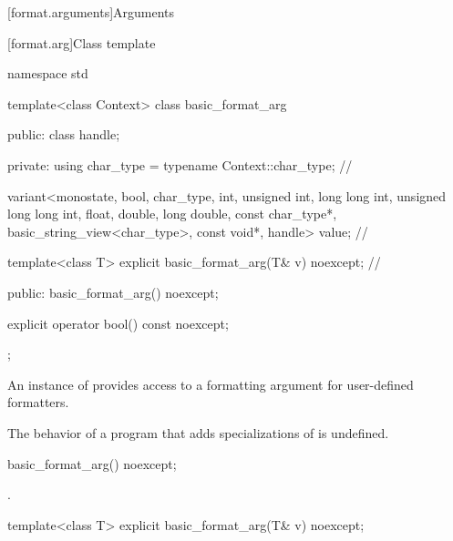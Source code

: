 [format.arguments]{Arguments}

[format.arg]{Class template }

%
\begin{codeblock}
namespace std {
  template<class Context>
  class basic_format_arg {
  public:
    class handle;

  private:
    using char_type = typename Context::char_type;                              // \expos

    variant<monostate, bool, char_type,
            int, unsigned int, long long int, unsigned long long int,
            float, double, long double,
            const char_type*, basic_string_view<char_type>,
            const void*, handle> value;                                         // \expos

    template<class T> explicit basic_format_arg(T& v) noexcept;                 // \expos

  public:
    basic_format_arg() noexcept;

    explicit operator bool() const noexcept;
  };
}
\end{codeblock}

\pnum
An instance of  provides access to
a formatting argument for user-defined formatters.

\pnum
The behavior of a program that adds specializations of
 is undefined.

%
\begin{itemdecl}
basic_format_arg() noexcept;
\end{itemdecl}

\begin{itemdescr}
\pnum
\ensures
{}.
\end{itemdescr}

\begin{itemdecl}
template<class T> explicit basic_format_arg(T& v) noexcept;
\end{itemdecl}

